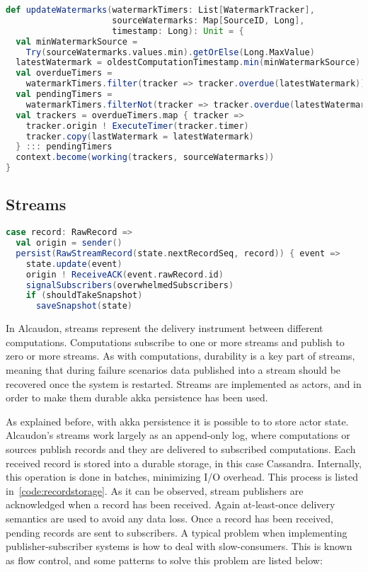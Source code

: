 \begin{lstlisting}[language=scala, frame=trBL, label=code:watermarkUpdate, float=ht, caption = {Watermark update logic}]
def updateWatermarks(watermarkTimers: List[WatermarkTracker],
                     sourceWatermarks: Map[SourceID, Long],
                     timestamp: Long): Unit = {
  val minWatermarkSource =
    Try(sourceWatermarks.values.min).getOrElse(Long.MaxValue)
  latestWatermark = oldestComputationTimestamp.min(minWatermarkSource)
  val overdueTimers =
    watermarkTimers.filter(tracker => tracker.overdue(latestWatermark))
  val pendingTimers =
    watermarkTimers.filterNot(tracker => tracker.overdue(latestWatermark))
  val trackers = overdueTimers.map { tracker =>
    tracker.origin ! ExecuteTimer(tracker.timer)
    tracker.copy(lastWatermark = latestWatermark)
  } ::: pendingTimers
  context.become(working(trackers, sourceWatermarks))
}
\end{lstlisting}


\subsection{Streams}

\begin{lstlisting}[language=scala, frame=trBL, label=code:recordstorage, float=ht, caption = {Stream record storage}]
case record: RawRecord =>
  val origin = sender()
  persist(RawStreamRecord(state.nextRecordSeq, record)) { event =>
    state.update(event)
    origin ! ReceiveACK(event.rawRecord.id)
    signalSubscribers(overwhelmedSubscribers)
    if (shouldTakeSnapshot)
      saveSnapshot(state)
\end{lstlisting}

In Alcaudon, streams represent the delivery instrument between different
computations. Computations subscribe to one or more streams and publish to zero
or more streams. As with computations, durability is a key part of streams,
meaning that during failure scenarios data published into a stream should be
recovered once the system is restarted. Streams are implemented as actors, and in
order to make them durable akka persistence has been used.

As explained before, with akka persistence it is possible to to store
actor state. Alcaudon's streams work largely as an append-only log,
where computations or sources publish records and they are delivered
to subscribed computations. Each received record is stored into a
durable storage, in this case Cassandra. Internally, this operation is
done in batches, minimizing I/O overhead. This process is listed
in~\ref{code:recordstorage}. As it can be observed, stream publishers
are acknowledged when a record has been received. Again at-least-once
delivery semantics are used to avoid any data loss. Once a record has
been received, pending records are sent to subscribers. A typical
problem when implementing publisher-subscriber systems is how to deal
with slow-consumers. This is known as flow control, and some patterns
to solve this problem are listed below:

